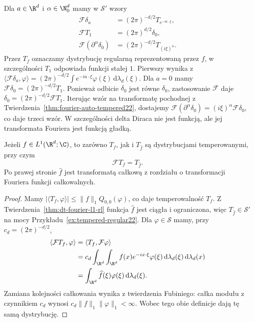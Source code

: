\begin{przyklad}
\label{ex:fourier-delta22}
Dla $a\in\R^d$ i $\alpha\in\N_0^d$ mamy w $\mathcal S'$
wzory
\[
\begin{aligned}
\mathcal F\delta_a&=(2\pi)^{-d/2}T_{e^{-ia\cdot\xi}},\\
\mathcal F T_1&=(2\pi)^{d/2}\delta_0,\\
\mathcal F(\partial^\alpha\delta_0)
&=(2\pi)^{-d/2}T_{(i\xi)^\alpha}.
\end{aligned}
\]
Przez $T_f$ oznaczamy dystrybucję regularną
reprezentowaną przez $f$, w szczególności $T_1$
odpowiada funkcji stałej $1$.
Pierwszy wynika z
$\langle\mathcal F\delta_a,\varphi\rangle
=(2\pi)^{-d/2}\int e^{-ia\cdot\xi}\varphi(\xi)
\,\mathrm d\lambda_d(\xi)$.
Dla $a=0$ mamy $\mathcal F\delta_0=(2\pi)^{-d/2}T_1$.
Ponieważ odbicie $\delta_0$ jest równe $\delta_0$,
zastosowanie $\mathcal F$ daje
$\delta_0=(2\pi)^{-d/2}\mathcal F T_1$.
Iterując wzór na transformatę pochodnej z
Twierdzenia~\ref{thm:fourier-auto-tempered22}, dostajemy
$\mathcal F(\partial^\alpha\delta_0)
=(i\xi)^\alpha\mathcal F\delta_0$, co daje trzeci wzór.
W szczególności delta Diraca nie jest funkcją,
ale jej transformata Fouriera jest funkcją gładką.
\end{przyklad}

\begin{stwierdzenie}
\label{prop:dt-tempered-fourier-l1}
Jeżeli $f\in L^1(\R^d;\C)$, to zarówno $T_f$, jak i
$T_{\widehat f}$ są dystrybucjami temperowanymi, przy czym
\[
 \mathcal F T_f=T_{\widehat f}.
\]
Po prawej stronie $\widehat f$ jest transformatą całkową
z rozdziału o transformacji Fouriera funkcji całkowalnych.
\end{stwierdzenie}
\begin{proof}
Mamy $|\langle T_f,\varphi\rangle|
\le\|f\|_1 Q_{0,0}(\varphi)$, co daje temperowalność $T_f$.
Z Twierdzenia~\ref{thm:dt-fourier-l1-rl} funkcja $\widehat f$
jest ciągła i ograniczona, więc $T_{\widehat f}\in\mathcal S'$
na mocy Przykładu~\ref{ex:tempered-regular22}.
Dla $\varphi\in\mathcal S$ mamy, przy $c_d=(2\pi)^{-d/2}$,
\[
\begin{aligned}
 \langle\mathcal FT_f,\varphi\rangle
 &=\langle T_f,\mathcal F\varphi\rangle\\
 &=c_d\int_{\R^d}\int_{\R^d}f(x)e^{-ix\cdot\xi}
 \varphi(\xi)\,\mathrm d\lambda_d(\xi)\,\mathrm d\lambda_d(x)\\
 &=\int_{\R^d}\widehat f(\xi)\varphi(\xi)
 \,\mathrm d\lambda_d(\xi).
\end{aligned}
\]
Zamiana kolejności całkowania wynika z twierdzenia Fubiniego:
całka modułu z czynnikiem $c_d$ wynosi
$c_d\|f\|_1\|\varphi\|_1<\infty$.
Wobec tego obie definicje dają tę samą dystrybucję.
\end{proof}

